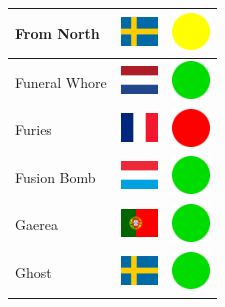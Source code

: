 \documentclass[12pt, a4paper, twoside]{report}
\begin{document}
\begin{center}
\begin{longtable}{|p{5cm}|p{2cm}|p{2cm}|}
			From North & \includegraphics[width=1cm]{4x3/se} & \includegraphics[width=1cm]{likes/m} \\ \hline
			Funeral Whore & \includegraphics[width=1cm]{4x3/nl} & \includegraphics[width=1cm]{likes/y} \\ \hline
			Furies & \includegraphics[width=1cm]{4x3/fr} & \includegraphics[width=1cm]{likes/n} \\ \hline
			Fusion Bomb & \includegraphics[width=1cm]{4x3/lu} & \includegraphics[width=1cm]{likes/y} \\ \hline
			Gaerea & \includegraphics[width=1cm]{4x3/pt} & \includegraphics[width=1cm]{likes/y} \\ \hline
			Ghost & \includegraphics[width=1cm]{4x3/se} & \includegraphics[width=1cm]{likes/y} \\ \hline

\end{longtable}
\end{center}
\end{document}

